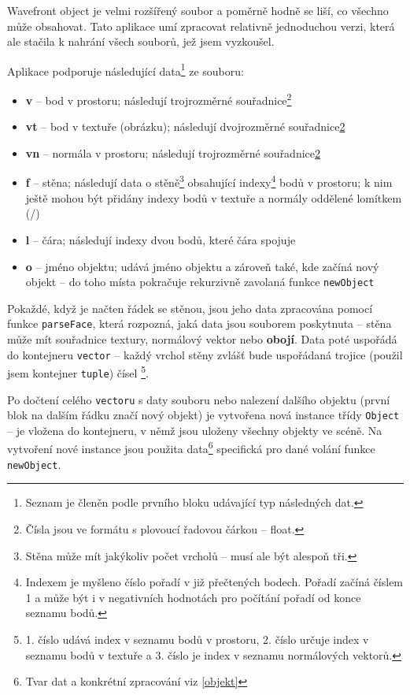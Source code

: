 \documentclass[a4paper, 11pt]{report}
\begin{document}
Wavefront object je velmi rozšířený soubor a poměrně hodně se liší, co všechno může obsahovat. Tato aplikace umí zpracovat relativně jednoduchou verzi, která ale stačila k nahrání všech souborů, jež jsem vyzkoušel.

Aplikace podporuje následující data\footnote{Seznam je členěn podle prvního bloku udávající typ následných dat.} ze souboru:
\begin{itemize}
    \item \textbf{v} -- bod v prostoru; následují trojrozměrné souřadnice\footnote{\label{float}Čísla jsou ve formátu s plovoucí řadovou čárkou -- float.}
    \item \textbf{vt} -- bod v textuře (obrázku); následují dvojrozměrné souřadnice\cref{float}
    \item \textbf{vn} -- normála v prostoru; následují trojrozměrné souřadnice\cref{float}
    \item \textbf{f} -- stěna; následují data o stěně\footnote{Stěna může mít jakýkoliv počet vrcholů -- musí ale být alespoň tři.} obsahující indexy\footnote{Indexem je myšleno číslo pořadí v již přečtených bodech. Pořadí začíná číslem 1 a může být i v negativních hodnotách pro počítání pořadí od konce seznamu bodů.} bodů v prostoru; k nim ještě mohou být přidány indexy bodů v textuře a normály oddělené lomítkem (/)
    \item \textbf{l} -- čára; následují indexy dvou bodů, které čára spojuje
    \item \textbf{o} -- jméno objektu; udává jméno objektu a zároveň také, kde začíná nový objekt -- do toho místa pokračuje rekurzivně zavolaná funkce \texttt{newObject}
\end{itemize}

Pokaždé, když je načten řádek se stěnou, jsou jeho data zpracována pomocí funkce \texttt{parseFace}, která rozpozná, jaká data jsou souborem poskytnuta -- stěna může mít souřadnice textury, normálový vektor nebo \textbf{obojí}. Data poté uspořádá do kontejneru \texttt{vector} -- každý vrchol stěny zvlášť bude uspořádaná trojice (použil jsem kontejner \texttt{tuple}) čísel \footnote{1. číslo udává index v seznamu bodů v prostoru, 2. číslo určuje index v seznamu bodů v textuře a 3. číslo je index v seznamu normálových vektorů.}.

Po dočtení celého \texttt{vectoru} s daty souboru nebo nalezení dalšího objektu (první blok na dalším řádku značí nový objekt) je vytvořena nová instance třídy \texttt{Object} -- je vložena do kontejneru, v němž jsou uloženy všechny objekty ve scéně. Na vytvoření nové instance jsou použita data\footnote{Tvar dat a konkrétní zpracování viz \ref{objekt}} specifická pro dané volání funkce \texttt{newObject}.
\end{document}
